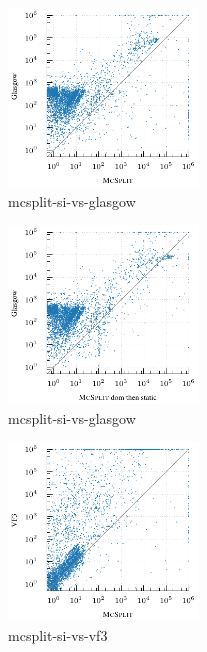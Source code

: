 \begin{figure}[h!]
    \centering
    \includegraphics*[width=0.45\textwidth]{14b-mcsplit-induced-si/decision-instances-experiment/experiment/plots/mcsplit-si-vs-glasgow}
    \caption{mcsplit-si-vs-glasgow}
    \label{figure:mcsplit-si-vs-glasgow}
\end{figure}

\begin{figure}[h!]
    \centering
    \includegraphics*[width=0.45\textwidth]{14b-mcsplit-induced-si/decision-instances-experiment/experiment/plots/mcsplit-si-domstatic-vs-glasgow}
    \caption{mcsplit-si-vs-glasgow}
    \label{figure:mcsplit-si-vs-glasgow}
\end{figure}

\begin{figure}[h!]
    \centering
    \includegraphics*[width=0.45\textwidth]{14b-mcsplit-induced-si/decision-instances-experiment/experiment/plots/mcsplit-si-vs-vf3}
    \caption{mcsplit-si-vs-vf3}
    \label{figure:mcsplit-si-vs-vf3}
\end{figure}

